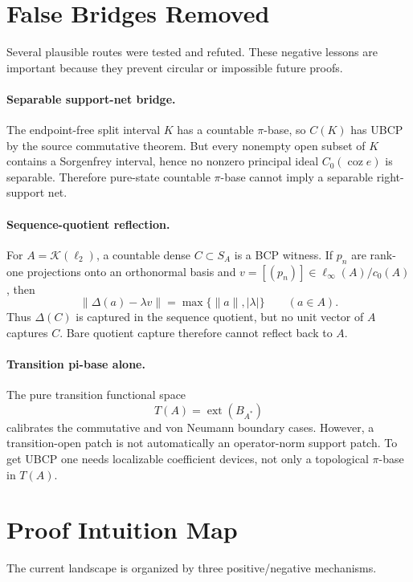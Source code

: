 \documentclass[11pt]{article}
\newcommand{\Kcal}{\mathcal K}
\begin{document}
\section*{False Bridges Removed}

Several plausible routes were tested and refuted.  These negative lessons are
important because they prevent circular or impossible future proofs.

\paragraph{Separable support-net bridge.}
The endpoint-free split interval \(K\) has a countable \(\pi\)-base, so
\(C(K)\) has UBCP by the source commutative theorem.  But every nonempty open
subset of \(K\) contains a Sorgenfrey interval, hence no nonzero principal
ideal \(C_0(\operatorname{coz} e)\) is separable.  Therefore pure-state
countable \(\pi\)-base cannot imply a separable right-support net.

\paragraph{Sequence-quotient reflection.}
For \(A=\Kcal(\ell_2)\), a countable dense \(C\subset S_A\) is a BCP witness.
If \(p_n\) are rank-one projections onto an orthonormal basis and
\(v=[(p_n)]\in \ell_\infty(A)/c_0(A)\), then
\[
        \|\Delta(a)-\lambda v\|
        =
        \max\{\|a\|,|\lambda|\}
        \qquad(a\in A).
\]
Thus \(\Delta(C)\) is captured in the sequence quotient, but no unit vector
of \(A\) captures \(C\).  Bare quotient capture therefore cannot reflect back
to \(A\).

\paragraph{Transition pi-base alone.}
The pure transition functional space
\[
        T(A)=\operatorname{ext}(B_{A^*})
\]
calibrates the commutative and von Neumann boundary cases.  However, a
transition-open patch is not automatically an operator-norm support patch.
To get UBCP one needs localizable coefficient devices, not only a topological
\(\pi\)-base in \(T(A)\).

\section*{Proof Intuition Map}

The current landscape is organized by three positive/negative mechanisms.
\end{document}

